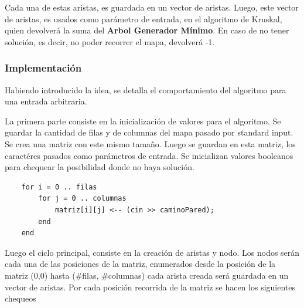     Cada una de estas aristas, es guardada en un vector de aristas.
    Luego, este vector de aristas, es usados como parámetro de entrada, en el algoritmo de Kruskal, quien devolverá la suma del \textbf{Arbol Generador Mínimo}. En caso de no tener solución, es decir, no poder recorrer el mapa, devolverá -1.



	\subsubsection{Implementación}\label{ej2_imp}


	Habiendo introducido la idea, se detalla el comportamiento del algoritmo para
	una entrada arbitraria. \par 

	La primera parte consiste en la inicialización de valores para el algoritmo. Se guardar la cantidad de filas y de columnas del mapa pasado por standard input. Se crea una matriz con este mismo tamaño. Luego se guardan en esta matriz, los caractéres pasados como parámetros de entrada. Se inicializan valores booleanos para chequear la posibilidad donde no haya solución.

	\begin{codesnippet}
    \begin{verbatim}
    for i = 0 .. filas
        for j = 0 .. columnas
            matriz[i][j] <-- (cin >> caminoPared);
        end
    end
    \end{verbatim}
    \end{codesnippet}

	Luego el ciclo principal, consiste en la creación de aristas y nodo. Los nodos serán cada una de las posiciones de la matriz, enumerados desde la posición de la matriz (0,0) hasta (\#filas, \#columnas) cada arista creada será guardada en un vector de aristas. Por cada posición recorrida de la matriz se hacen los siguientes chequeos

